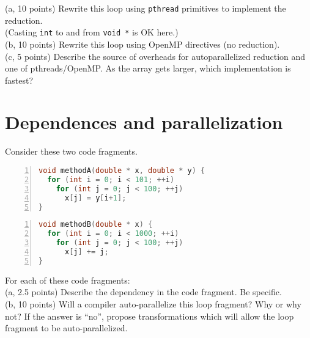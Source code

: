 \documentclass[12pt]{article}
\begin{document}
\noindent (a, 10 points) Rewrite this loop using {\tt pthread} primitives to implement the reduction.\\
(Casting {\tt int} to and from {\tt void *} is OK here.)\\[1em]
\noindent (b, 10 points) Rewrite this loop using OpenMP directives (no reduction). 
\\[1em]
(c, 5 points) Describe the source of overheads for autoparallelized reduction and one of
pthreads/OpenMP. As the array gets larger, which implementation is fastest?

\section{Dependences and parallelization}

Consider these two code fragments.
{\small 
\begin{lstlisting}[language=C,numbers=left,basicstyle=\ttfamily\scriptsize,numberstyle=\tiny]
void methodA(double * x, double * y) {
  for (int i = 0; i < 101; ++i)
    for (int j = 0; j < 100; ++j)
      x[j] = y[i+1];
}
\end{lstlisting}
} 

{\small 
\begin{lstlisting}[language=C,numbers=left,basicstyle=\ttfamily\scriptsize,numberstyle=\tiny]
void methodB(double * x) {
  for (int i = 0; i < 1000; ++i)
    for (int j = 0; j < 100; ++j)
      x[j] += j;
}
\end{lstlisting}
} 

For each of these code fragments:\\[1em]
\noindent
(a, 2.5 points) Describe the dependency in the code fragment. Be specific.\\[1em]
(b, 10 points) Will a compiler auto-parallelize this loop fragment? Why or why not? 
If the answer is ``no'', propose transformations which will allow the loop fragment
to be auto-parallelized. \\[1em]
\end{document}
